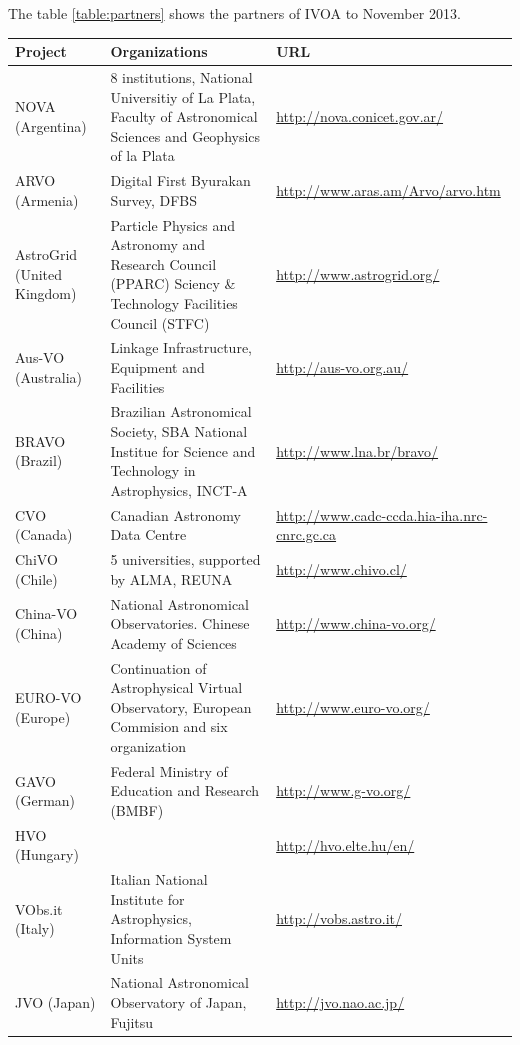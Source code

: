 The table \ref{table:partners} shows the partners of IVOA to
November 2013.\\

\begin{table}[h!t]
	\centering
	\begin{tabular}{|l|p{9cm}|l|}
	\hline
	\textbf{Project} & \textbf{Organizations} & \textbf{URL} \\
	\hline
	NOVA (Argentina) & 8 institutions, National Universitiy of La Plata, Faculty of Astronomical Sciences and Geophysics of la Plata & \url{http://nova.conicet.gov.ar/} \\
	\hline
	ARVO (Armenia) & Digital First Byurakan Survey, DFBS & \url{http://www.aras.am/Arvo/arvo.htm} \\
	\hline
	AstroGrid (United Kingdom) & Particle Physics and Astronomy and Research Council (PPARC) Sciency \& Technology Facilities Council (STFC) &\url{http://www.astrogrid.org/} \\
	\hline
	Aus-VO (Australia) & Linkage Infrastructure, Equipment and Facilities & \url{http://aus-vo.org.au/} \\
	\hline
	BRAVO (Brazil) & Brazilian Astronomical Society, SBA National Institue for Science and Technology in Astrophysics, INCT-A & \url{http://www.lna.br/bravo/} \\
	\hline
   	CVO (Canada) & Canadian Astronomy Data Centre & \url{http://www.cadc-ccda.hia-iha.nrc-cnrc.gc.ca} \\
	\hline
    ChiVO (Chile) & 5 universities, supported by ALMA, REUNA & \url{http://www.chivo.cl/} \\
	\hline
    China-VO (China) & National Astronomical Observatories. Chinese Academy of Sciences & \url{http://www.china-vo.org/} \\
	\hline
	EURO-VO (Europe) & Continuation of Astrophysical Virtual Observatory, European Commision and six organization & \url{http://www.euro-vo.org/} \\
	\hline
	GAVO (German) & Federal Ministry of Education and Research (BMBF) & \url{http://www.g-vo.org/} \\
	\hline
	HVO (Hungary) & & \url{http://hvo.elte.hu/en/} \\
	\hline
	VObs.it (Italy) & Italian National Institute for Astrophysics, Information System Units & \url{http://vobs.astro.it/} \\
	\hline
	JVO (Japan) & National Astronomical Observatory of Japan, Fujitsu & \url{http://jvo.nao.ac.jp/}\\

\end{tabular}
\end{table}
